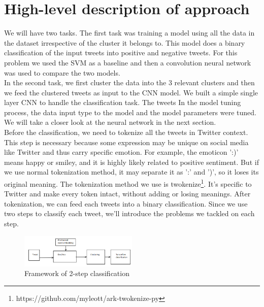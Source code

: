 \documentclass[conference]{IEEEtran}
\begin{document}
\section{High-level description of approach}
We will have two tasks. The first task was training a model using all the data in the dataset irrespective of the cluster it belongs to. This model does a binary classification of the input tweets into positive and negative tweets. For this problem we used the SVM as a baseline and then a convolution neural network was used to compare the two models.
\\ \indent
In the second task, we first cluster the data into the 3 relevant clusters and then we feed the clustered tweets as input to the CNN model. We built a simple single layer CNN to handle the classification task. The tweets  In the model tuning process, the data input type to the model and the model parameters  were tuned. We will take a closer look at the neural network in the next section.
\\ \indent
Before the classification, we need to tokenize all the tweets in Twitter context. This step is necessary because some expression may be unique on social media like Twitter and thus carry specific emotion. For example, the emoticon ':)' means happy or smiley, and it is highly likely related to positive sentiment. But if we use normal tokenization method, it may separate it as ':' and ')', so it loses its original meaning. The tokenization method we use is twokenize\footnote{https://github.com/myleott/ark-twokenize-py}. It's specific to Twitter and make every token intact, without adding or losing meanings. After tokenization, we can feed each tweets into a binary classification.
Since we use two steps to classify each tweet, we'll introduce the problems we tackled on each step.
\\ \indent
\begin{figure}[h]
\centering
\includegraphics[width=0.5\textwidth]{Capture(2)}
\caption{Framework of 2-step classification}

\end{figure}
\end{document}
